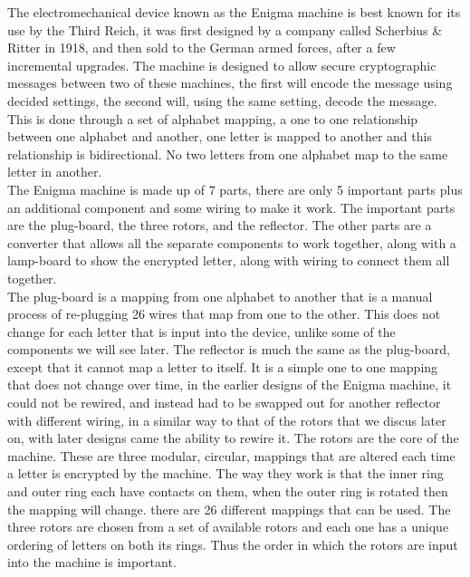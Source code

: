 \documentclass[12pt,a4paper]{article}
\begin{document}
The electromechanical device known as the Enigma machine is best known for its use by the Third Reich, it was first designed by a company called Scherbius \& Ritter in 1918, and then sold to the German armed forces, after a few incremental upgrades. The machine is designed to allow secure cryptographic messages between two of these machines, the first will encode the message using decided settings, the second will, using the same setting, decode the message. This is done through a set of alphabet mapping, a one to one relationship between one alphabet and another, one letter is mapped to another and this relationship is bidirectional. No two letters from one alphabet map to the same letter in another.\\

The Enigma machine is made up of 7 parts, there are only 5 important parts plus an additional component and some wiring to make it work. The important parts are the plug-board, the three rotors, and the reflector. The other parts are a converter that allows all the separate components to work together, along with a lamp-board to show the encrypted letter, along with wiring to connect them all together.\\

The plug-board is a mapping from one alphabet to another that is a manual process of re-plugging 26 wires that map from one to the other. This does not change for each letter that is input into the device, unlike some of the components we will see later. The reflector is much the same as the plug-board, except that it cannot map a letter to itself. It is a simple one to one mapping that does not change over time, in the earlier designs of the Enigma machine, it could not be rewired, and instead had to be swapped out for another reflector with different wiring, in a similar way to that of the rotors that we discus later on, with later designs came the ability to rewire it. The rotors are the core of the machine. These are three modular, circular, mappings that are altered each time a letter is encrypted by the machine. The way they work is that the inner ring and outer ring each have contacts on them, when the outer ring is rotated then the mapping will change. there are 26 different mappings that can be used. The three rotors are chosen from a set of available rotors and each one has a unique ordering of letters on both its rings. Thus the order in which the rotors are input into the machine is important.\\
\end{document}
